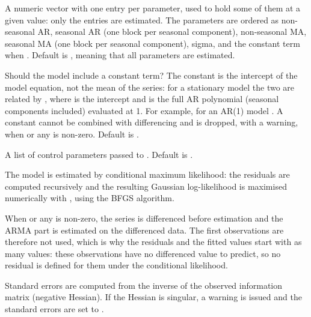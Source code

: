\documentclass[a4paper]{book}
\begin{document}
\begin{Arguments}
\begin{ldescription}
\item[\code{fixed}] A numeric vector with one entry per parameter, used to hold some of them
at a given value: only the  entries are estimated. The parameters are
ordered as non-seasonal AR, seasonal AR (one block per seasonal component),
non-seasonal MA, seasonal MA (one block per seasonal component), sigma, and the
constant term when . Default is , meaning
that all parameters are estimated.

\item[\code{include.constant}] Should the model include a constant term? The constant is the
intercept of the model equation, not the mean of the series: for a stationary model
the two are related by , where  is the intercept and
 is the full AR polynomial (seasonal components included) evaluated
at 1. For example, for an AR(1) model . A constant
cannot be combined with differencing and is dropped, with a warning, when 
or any  is non-zero. Default is .

\item[\code{optim\_control}] A list of control parameters passed to .
Default is .
\end{ldescription}
\end{Arguments}
%
\begin{Details}
The model is estimated by conditional maximum likelihood: the residuals are computed
recursively and the resulting Gaussian log-likelihood is maximised numerically with
, using the BFGS algorithm.

When  or any  is non-zero, the series is differenced before estimation
and the ARMA part is estimated on the differenced data. The first
 observations are therefore not used, which is why the residuals
and the fitted values start with as many  values: these observations have
no differenced value to predict, so no residual is defined for them under the
conditional likelihood.

Standard errors are computed from the inverse of the observed information matrix
(negative Hessian). If the Hessian is singular, a warning is issued and the standard
errors are set to .
\end{Details}
%
\end{document}
